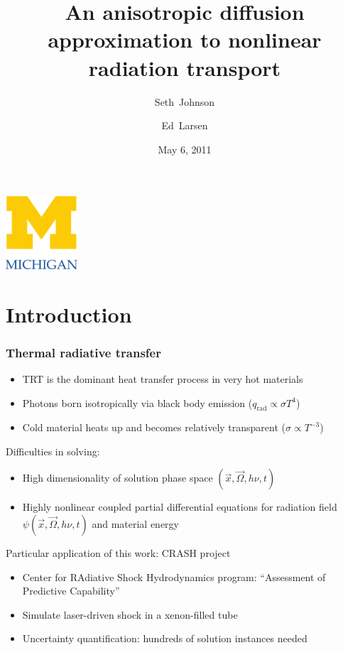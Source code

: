 \documentclass{beamer}
\title[ORNL Seminar]%
{An anisotropic diffusion approximation to nonlinear radiation transport}
\author[SRJ, EWL]{Seth~Johnson \and Ed~Larsen}
\institute[UMich]{
University of Michigan, Ann Arbor
}
\date[5/6/2011]{May 6, 2011}
\begin{document}

\begin{frame}
\titlepage
\begin{center}
  \includegraphics[width=0.2\textwidth]{../figures/umlogo}
\end{center}
\end{frame}

\section{Introduction}
\begin{frame}
  \frametitle{Thermal radiative transfer}
  \begin{itemize}
    \item TRT is the dominant heat transfer process in very hot materials
    \item Photons born isotropically via black body emission
      ($q_\text{rad} \propto \sigma T^4$)
    \item Cold material heats up and becomes relatively transparent
      ($\sigma\propto T^{-3}$)
  \end{itemize}

  Difficulties in solving:
  \begin{itemize}
    \item High dimensionality of solution phase space $(\vec{x}, \vec{\Omega},
      h\nu, t)$
    \item Highly nonlinear coupled partial differential equations for radiation
      field $\psi(\vec{x}, \vec{\Omega}, h\nu, t)$ and material energy
  \end{itemize}

  Particular application of this work: CRASH project
  \begin{itemize}
    \item Center for RAdiative Shock Hydrodynamics program: ``Assessment
      of Predictive Capability''
    \item Simulate laser-driven shock in a xenon-filled tube
    \item Uncertainty quantification: hundreds of solution instances needed
  \end{itemize}
\end{frame}
\end{document}

